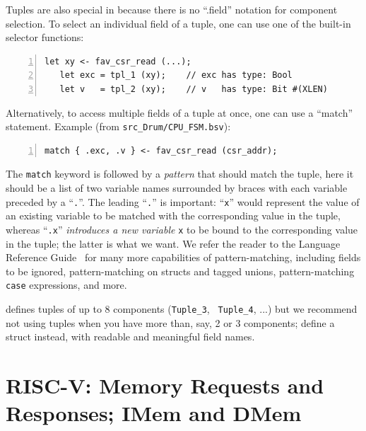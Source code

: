 Tuples are also special in {\BSV} because there is no ``.field''
notation for component selection.  To select an individual field of a
tuple, one can use one of the built-in selector functions:

{\footnotesize
\begin{Verbatim}[frame=single, numbers=left]
   let xy <- fav_csr_read (...);
   let exc = tpl_1 (xy);    // exc has type: Bool
   let v   = tpl_2 (xy);    // v   has type: Bit #(XLEN)
\end{Verbatim}
}

Alternatively, to access multiple fields of a tuple at once, one can
use a ``match'' statement. Example (from \verb|src_Drum/CPU_FSM.bsv|):


{\footnotesize
\begin{Verbatim}[frame=single, numbers=left]
   match { .exc, .v } <- fav_csr_read (csr_addr);
\end{Verbatim}
}

The \verb|match| keyword is followed by a \emph{pattern} that should
match the tuple, {\ie} here it should be a list of two variable names
surrounded by braces with each variable preceded by a ``\verb|.|''.
The leading ``\verb|.|'' is important: ``\verb|x|'' would represent
the value of an existing variable to be matched with the corresponding
value in the tuple, whereas ``\verb|.x|'' \emph{introduces a new
variable} \verb|x| to be bound to the corresponding value in the
tuple; the latter is what we want.  We refer the reader to the {\BSV}
Language Reference Guide~\cite{BSV_Lang_Ref_Guide} for many more
capabilities of pattern-matching, including fields to be ignored,
pattern-matching on structs and tagged unions, pattern-matching
\verb|case| expressions, and more.

{\BSV} defines tuples of up to 8 components ({\tt Tuple\_3}, {\tt
Tuple\_4}, ...) but we recommend not using tuples when you have more
than, say, 2 or 3 components; define a struct instead, with readable
and meaningful field names.


\section{RISC-V: Memory Requests and Responses; IMem and DMem}

